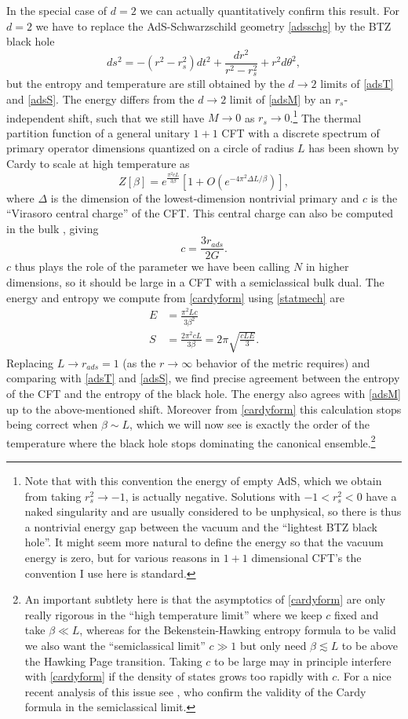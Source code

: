 \documentclass[12pt]{article}
\newcommand{\be}{\begin{equation}}
\newcommand{\ee}{\end{equation}}
\begin{document}
In the special case of $d=2$ we can actually quantitatively confirm this result.  For $d=2$ we have to replace the AdS-Schwarzschild geometry \eqref{adsschg} by the BTZ black hole \cite{Banados:1992wn}
\be
ds^2=-(r^2-r_s^2)dt^2+\frac{dr^2}{r^2-r_s^2}+r^2d\theta^2,
\ee
but the entropy and temperature are still obtained by the $d\to 2$ limits of \eqref{adsT} and \eqref{adsS}.  The energy differs from the $d\to 2$ limit of \eqref{adsM} by an $r_s$-independent shift, such that we still have $M\to 0$ as $r_s\to 0$.\footnote{Note that with this convention the energy of empty AdS, which we obtain from taking $r_s^2\to -1$, is actually negative.  Solutions with $-1<r_s^2<0$ have a naked singularity and are usually considered to be unphysical, so there is thus a nontrivial energy gap between the vacuum and the ``lightest BTZ black hole''.  It might seem more natural to define the energy so that the vacuum energy is zero, but for various reasons in $1+1$ dimensional CFT's the convention I use here is standard.}  The thermal partition function of a general unitary $1+1$ CFT with a discrete spectrum of primary operator dimensions quantized on a circle of radius $L$ has been shown by Cardy \cite{Cardy:1986ie} to scale at high temperature as
\be\label{cardyform}
Z[\beta]= e^{\frac{\pi^2 c L}{3\beta}}\left[1+O\left(e^{-4\pi^2 \Delta L/\beta}\right)\right],
\ee
where $\Delta$ is the dimension of the lowest-dimension nontrivial primary and $c$ is the ``Virasoro central charge'' of the CFT.  This central charge can also be computed in the bulk \cite{Brown:1986nw}, giving
\be
c=\frac{3 r_{\mathit{ads}}}{2G}.
\ee
$c$ thus plays the role of the parameter we have been calling $N$ in higher dimensions, so it should be large in a CFT with a semiclassical bulk dual.  The energy and entropy we compute from \eqref{cardyform} using \eqref{statmech} are 
\begin{align}\nonumber
E&=\frac{\pi^2 L c}{3\beta^2}\\
S&=\frac{2\pi^2 c L}{3\beta}=2\pi \sqrt{\frac{c LE}{3}}.
\end{align}
Replacing $L\to r_{\mathit{ads}}=1$ (as the $r\to\infty$ behavior of the metric requires) and comparing with \eqref{adsT} and \eqref{adsS}, we find precise agreement between the entropy of the CFT and the entropy of the black hole.  The energy also agrees with \eqref{adsM} up to the above-mentioned shift.  Moreover from \eqref{cardyform} this calculation stops being correct when $\beta\sim L$, which we will now see is exactly the order of the temperature where the black hole stops dominating the canonical ensemble.\footnote{An important subtlety here is that the asymptotics of \eqref{cardyform} are only really rigorous in the ``high temperature limit'' where we keep $c$ fixed and take $\beta \ll L$, whereas for the Bekenstein-Hawking entropy formula to be valid we also want the ``semiclassical limit'' $c\gg 1$ but only need $\beta \lesssim L$ to be above the Hawking Page transition.  Taking $c$ to be large may in principle interfere with \eqref{cardyform} if the density of states grows too rapidly with $c$.  For a nice recent analysis of this issue see \cite{Hartman:2014oaa}, who confirm the validity of the Cardy formula in the semiclassical limit.}  
\end{document}
